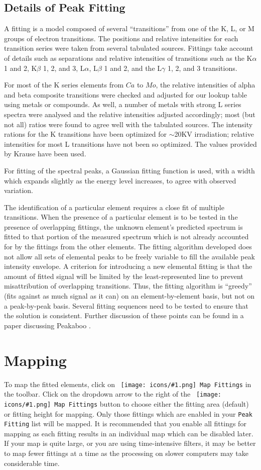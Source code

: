 \documentclass[article,twoside,11pt]{report}
\newcommand{\command}[1]{\texttt{#1}}
\newcommand{\icon}[1]{\texttt{[image: icons/\#1.png]}}
\newcommand{\button}[2]{\ \command{\icon{#1} #2}}
\newcommand{\element}[1]{$#1$}
\newcommand{\tocchapter}[1]{\cleardoublepage\chapter*{#1}\addcontentsline{toc}{chapter}{#1}}
\newcommand{\tocsection}[1]{\section*{#1}\addcontentsline{toc}{section}{#1}}
\begin{document}
\tocsection{Details of Peak Fitting}

A fitting is a model composed of several ``transitions'' from one of the K, L, or M groups of 
electron transitions. The positions and relative intensities for each transition series
were taken from several tabulated sources. Fittings take account of details such as 
separations and relative intensities of transitions such as the K$\alpha$ 1 and 2,  
K$\beta$ 1, 2, and 3, L$\alpha$, L$\beta$ 1 and 2, and the L$\gamma$ 1, 2, and 3 transitions.

For most of the K series elements from \element{Ca} to \element{Mo}, the relative 
intensities of alpha and beta composite transitions were checked and adjusted for our 
lookup table using metals or compounds. As well, a number of metals with strong L 
series spectra were analysed and the relative intensities adjusted accordingly; 
most (but not all) ratios were found to agree well with the tabulated sources. The 
intensity rations for the K transitions have been optimized for $\sim$20KV irradiation; relative 
intensities for most L transitions have not been so optimized. The values provided by Krause 
\cite{kraus} have been used. 

For fitting of the spectral peaks, a Gaussian fitting function is used, with a width which
expands slightly as the energy level increases, to agree with observed variation.

The identification of a particular element requires a close fit of multiple transitions. 
When the presence of a particular element is to be tested in the presence of overlapping 
fittings, the unknown element's predicted spectrum is fitted to that portion of the 
measured spectrum which is not already accounted for by the fittings from the other 
elements. The fitting algorithm developed does not allow all sets of elemental peaks to 
be freely variable to fill the available peak intensity envelope. A criterion for 
introducing a new elemental fitting is that the amount of fitted signal will be limited 
by the least-represented line to prevent misattribution of overlapping transitions. Thus, the 
fitting algorithm is ``greedy'' (fits against as much signal as it can) on an 
element-by-element basis, but not on a peak-by-peak basis. Several fitting sequences 
need to be tested to ensure that the solution is consistent. Further discussion of these 
points can be found in a paper discussing Peakaboo \cite{mcintyre}.


\tocchapter{Mapping}

To map the fitted elements, click on \button{map}{Map Fittings} in the toolbar. 
Click on the dropdown arrow to the right of the \button{map}{Map Fittings} button to 
choose either the fitting area (default) or fitting height for mapping. Only those 
fittings which are enabled in your \command{Peak Fitting} list will be mapped. It 
is recommended that you enable all fittings for mapping as each fitting results in 
an individual map which can be disabled later. If your map is quite large, or you 
are using time-intensive filters, it may be better to map fewer fittings at a 
time as the processing on slower computers may take considerable time.
\end{document}
